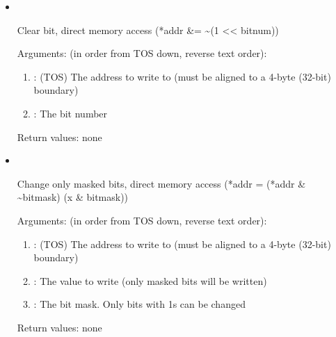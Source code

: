 \begin{itemize}
\noindent Set bit, direct memory access (*addr {\textbar}= (1 << bitnum))

\noindent Arguments: (in order from TOS down, reverse text order):
\begin{enumerate}
\item {}: (TOS) The address to write to (must be aligned to a 4-byte (32-bit) boundary)
\item {}: The bit number
\end{enumerate}

\noindent Return values: none

\item {}\ 

\noindent Clear bit, direct memory access (*addr {\&}= {\textasciitilde}(1 << bitnum))

\noindent Arguments: (in order from TOS down, reverse text order):
\begin{enumerate}
\item {}: (TOS) The address to write to (must be aligned to a 4-byte (32-bit) boundary)
\item {}: The bit number
\end{enumerate}

\noindent Return values: none

\item {}\ 

\noindent Change only masked bits, direct memory access (*addr = (*addr {\&} {\textasciitilde}bitmask) {\textbar} (x {\&} bitmask))

\noindent Arguments: (in order from TOS down, reverse text order):
\begin{enumerate}
\item {}: (TOS) The address to write to (must be aligned to a 4-byte (32-bit) boundary)
\item {}: The value to write (only masked bits will be written)
\item {}: The bit mask. Only bits with 1s can be changed
\end{enumerate}

\noindent Return values: none

\end{itemize}

